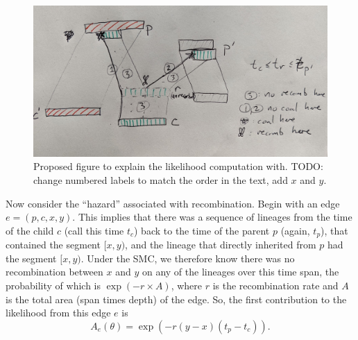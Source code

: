 \documentclass{article}
\begin{document}
\begin{figure}
    \centering
    \includegraphics[width=\textwidth]{figures/likelihood-sketch}
    \caption{
        Proposed figure to explain the likelihood computation with.
        TODO: change numbered labels to match the order in the text,
        add $x$ and $y$.
        \label{fig:likelihood}
    }
\end{figure}

Now consider the ``hazard'' associated with recombination.
Begin with an edge $e = (p,c,x,y)$.
This implies that there was a sequence of lineages
from the time of the child $c$ (call this time $t_c$)
back to the time of the parent $p$ (again, $t_p$),
that contained the segment $[x,y)$,
and the lineage that directly inherited from $p$
had the segment $[x,y)$.
Under the SMC,
we therefore know there was no recombination between $x$ and $y$
on any of the lineages 
over this time span,
the probability of which is
$\exp(-r \times A)$, where $r$ is the recombination rate
and $A$ is the total area (span times depth) of the edge.
So, the first contribution to the likelihood from this edge $e$ is
\begin{equation}\label{eq:span}
A_e(\theta) = \exp(-r (y-x)(t_p - t_{c})) .
\end{equation}
\end{document}
